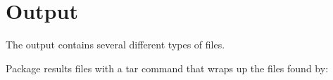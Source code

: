\documentclass{article}
\begin{document}
\begin{comment}
\section{Workflow}

\tikzstyle{decision} = [diamond, draw, fill=blue!20, 
    text width=4.5em, text badly centered, node distance=3cm, inner sep=0pt]
\tikzstyle{block} = [rectangle, draw, fill=blue!20, 
    text width=5em, text centered, rounded corners, minimum height=4em]
\tikzstyle{line} = [draw, -latex']
\tikzstyle{cloud} = [draw, ellipse,fill=red!20, node distance=3cm,
    minimum height=2em]

\begin{center}    
\begin{tikzpicture}[node distance = 2cm, auto]
    \node [block] (align) {Perform bwa alignment};
    \node [cloud, left of=align] (fastq) {.fastq};
    \node [cloud, below of=align, node distance=3cm] (bam) {.bam};
    \node [block, below of=bam, node distance=3cm] (consensusY) {Generate consensus Y sequences from BAM};
    \node [block, left of=consensusY, node distance=3cm] (consensusX) {Generate consensus X sequences from BAM};
    \node [block, right of=consensusY, node distance=3cm] (consensusZ) {Generate consensus Z sequences from BAM};
    \node [block, below of=consensusY, node distance=3cm] (aggregate) {Aggregate Results};
    \node [block, below of=aggregate, node distance=3cm] (graphics) {Generate R graphics};
    \path [line] (fastq) -- (align);
    \path [line] (align) -- (bam);
    \path [line] (bam) -- (consensusX);
    \path [line] (bam) -- (consensusY);
    \path [line] (bam) -- (consensusZ);
    \path [line] (consensusX) -- (aggregate);
    \path [line] (consensusY) -- (aggregate);
    \path [line] (consensusZ) -- (aggregate);
    \path [line] (aggregate) -- (graphics);
    
\end{tikzpicture}
\end{center}
\end{comment}


\section{Output}

The output contains several different types of files.

Package results files with a tar command that wraps up the files found by:
\end{document}
